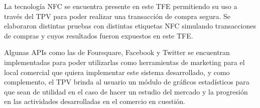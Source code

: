 {La tecnolog\'ia \ac{NFC} se encuentra presente en este \ac{TFE} permitiendo su uso a trav\'es del \ac{TPV} para poder realizar una transacci\'on de compra segura. Se elaboraron distintas pruebas con distintas etiquetas \ac{NFC} simulando transacciones de compras y cuyos resultados fueron expuestos en este \ac{TFE}.

Algunas \ac{APIs} como las de Foursquare\Si{\texttrademark}, Facebook\Si{\texttrademark} y Twitter\Si{\texttrademark} se encuentran implementadas para poder utilizarlas como herramientas de marketing para el local comercial que quiera implementar este sistema desarrollado, y como complemento, el \ac{TPV} brinda al usuario un m\'odulo de gr\'aficos estad\'isticos para que sean de utilidad en el caso de hacer un estudio del mercado y la progresi\'on en las actividades desarrolladas en el comercio en cuesti\'on.

}
